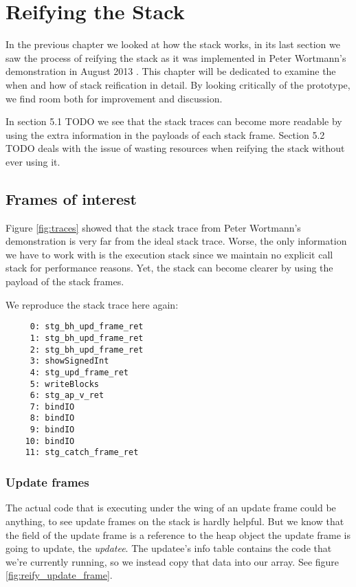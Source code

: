 \chapter{Reifying the Stack}

In the previous chapter we looked at how the stack works, in its
last section we saw the process of reifying the stack as it was
implemented in Peter Wortmann's demonstration in August 2013
\cite{stack_traces_ticket}. This chapter will be dedicated to examine
the when and how of stack reification in detail. By looking critically
of the prototype, we find room both for improvement and discussion.

In section 5.1 TODO we see that the stack traces can become more
readable by using the extra information in the payloads of each stack
frame. Section 5.2 TODO deals with the issue of wasting
resources when reifying the stack without ever using it.

\section{Frames of interest}

Figure \ref{fig:traces} showed that the stack trace from Peter Wortmann's
demonstration is very far from the ideal stack trace.  Worse, the only
information we have to work with is the execution stack since we maintain no
explicit call stack for performance reasons. Yet, the stack can become
clearer by using the payload of the stack frames.

We reproduce the stack trace here again:

\begin{verbatim}
     0: stg_bh_upd_frame_ret
     1: stg_bh_upd_frame_ret
     2: stg_bh_upd_frame_ret
     3: showSignedInt
     4: stg_upd_frame_ret
     5: writeBlocks
     6: stg_ap_v_ret
     7: bindIO
     8: bindIO
     9: bindIO
    10: bindIO
    11: stg_catch_frame_ret
\end{verbatim}


\subsection{Update frames} \label{sec:update_frames}

The actual code that is executing under the wing of an update frame
could be anything, to see update frames on the stack is hardly helpful.
But we know that the field of the update frame is a reference to the
heap object the update frame is going to update, the \emph{updatee}. The updatee's
info table contains the code that we're currently running, so we instead
copy that data into our array. See figure \ref{fig:reify_update_frame}.

